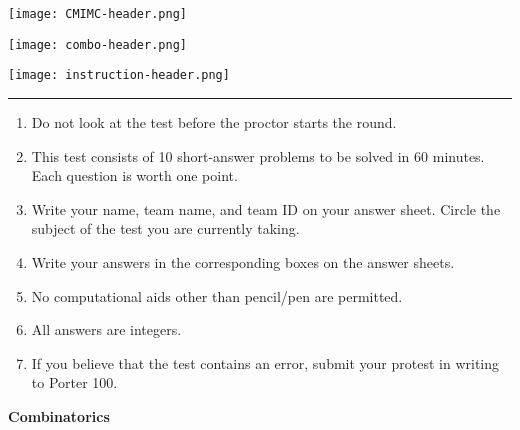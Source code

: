 \documentclass[10pt]{article}
\begin{document}
\thispagestyle{empty}
\begin{center}

\vspace*{90pt}

\texttt{[image: CMIMC-header.png]}

\texttt{[image: combo-header.png]}

\vspace{1.6in}

\texttt{[image: instruction-header.png]}
\noindent\rule{17.7cm}{2pt}
\end{center}

\vspace{10pt}

\begin{enumerate}
\large
\item Do not look at the test before the proctor starts the round.

\item This test consists of 10 short-answer problems to be solved in 60 minutes.
	Each question is worth one point.

\item Write your name, team name, and team ID on your answer sheet. Circle the
	subject of the test you are currently taking.

\item Write your answers in the corresponding boxes on the answer sheets.

\item No computational aids other than pencil/pen are permitted.

\item All answers are integers.

\item If you believe that the test contains an error, submit your protest in writing to Porter 100.
\end{enumerate}

\newpage

\begin{center}
\huge\textbf{Combinatorics}\normalsize

\vspace{3pt}
\end{center}
\end{document}
